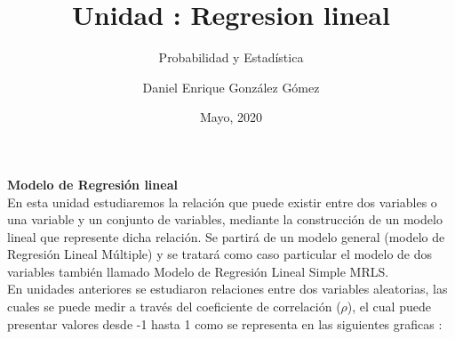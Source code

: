 \documentclass[base=hide,12pt]{elegantbook}
\title{Unidad : Regresion lineal}
\subtitle{Probabilidad y Estadística}
\author{Daniel Enrique González Gómez}
\institute{Pontificia Universidad Javeriana Cali}
\date{Mayo, 2020}
\begin{document}
	\textcolor{col4}{\LARGE \bf Modelo de Regresión lineal}    \\
	
	En esta unidad estudiaremos la relación que puede existir entre dos variables o una variable y un conjunto de variables, mediante la construcción de un modelo lineal que represente dicha relación. Se partirá de un modelo general (modelo de Regresión Lineal Múltiple) y se tratará como caso particular el modelo de dos variables también llamado Modelo de Regresión Lineal Simple MRLS.\\
	
	En unidades anteriores se estudiaron relaciones entre dos variables aleatorias, las cuales se puede medir a través del coeficiente de correlación ($\rho$),  el cual puede presentar valores desde  -1  hasta 1 como se representa en las siguientes graficas :
	
\end{document}
